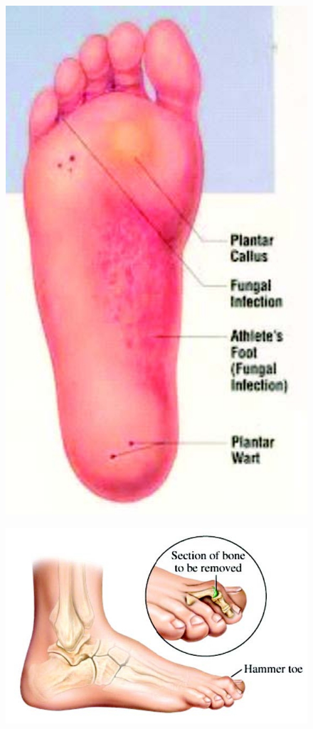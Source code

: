 {\begin{figure}
\includegraphics{images/060.jpg}
\end{figure}


\begin{figure}
\includegraphics{images/061.jpg}
\end{figure}


}

